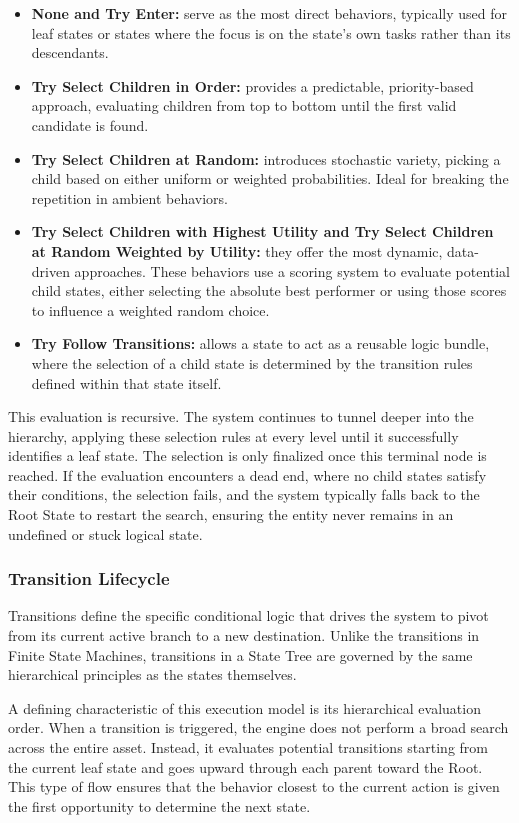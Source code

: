 \begin{itemize}
    \item \textbf{None and Try Enter:} serve as the most direct behaviors, typically used for leaf states or states where the focus is on the state's own tasks rather than its descendants.
    \item \textbf{Try Select Children in Order:} provides a predictable, priority-based approach, evaluating children from top to bottom until the first valid candidate is found.
    \item \textbf{Try Select Children at Random:} introduces stochastic variety, picking a child based on either uniform or weighted probabilities. Ideal for breaking the repetition in ambient behaviors.
    \item \textbf{Try Select Children with Highest Utility and Try Select Children at Random Weighted by Utility:} they offer the most dynamic, data-driven approaches. These behaviors use a scoring system to evaluate potential child states, either selecting the absolute best performer or using those scores to influence a weighted random choice.
    \item \textbf{Try Follow Transitions:} allows a state to act as a reusable logic bundle, where the selection of a child state is determined by the transition rules defined within that state itself.
\end{itemize}

This evaluation is recursive. The system continues to tunnel deeper into the hierarchy, applying these selection rules at every level until it successfully identifies a leaf state. The selection is only finalized once this terminal node is reached. If the evaluation encounters a dead end, where no child states satisfy their conditions, the selection fails, and the system typically falls back to the Root State to restart the search, ensuring the entity never remains in an undefined or stuck logical state.

\subsubsection{Transition Lifecycle}

Transitions define the specific conditional logic that drives the system to pivot from its current active branch to a new destination. Unlike the transitions in Finite State Machines, transitions in a State Tree are governed by the same hierarchical principles as the states themselves.

A defining characteristic of this execution model is its hierarchical evaluation order. When a transition is triggered, the engine does not perform a broad search across the entire asset. Instead, it evaluates potential transitions starting from the current leaf state and goes upward through each parent toward the Root. This type of flow ensures that the behavior closest to the current action is given the first opportunity to determine the next state.

